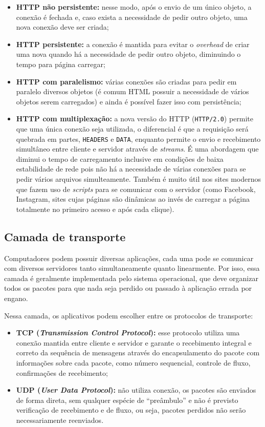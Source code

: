 \documentclass[brazilian,a4paper,twocolumn]{article}
\begin{document}
\begin{itemize}
    \item \textbf{HTTP não persistente:} nesse modo, após o envio de um único objeto, a conexão é fechada e, caso exista a necessidade de pedir outro objeto, uma nova conexão deve ser criada;
    \item \textbf{HTTP persistente:} a conexão é mantida para evitar o \textit{overhead} de criar uma nova quando há a necessidade de pedir outro objeto, diminuindo o tempo para página carregar;
    \item \textbf{HTTP com paralelismo:} várias conexões são criadas para pedir em paralelo diversos objetos (é comum HTML possuir a necessidade de vários objetos serem carregados) e ainda é possível fazer isso com persistência;
    \item \textbf{HTTP com multiplexação:} a nova versão do HTTP (\texttt{HTTP/2.0}) permite que uma única conexão seja utilizada, o diferencial é que a requisição será quebrada em partes, \texttt{HEADERS} e \texttt{DATA}, enquanto permite o envio e recebimento simultâneo entre cliente e servidor através de \textit{streams}. É uma abordagem que diminui o tempo de carregamento inclusive em condições de baixa estabilidade de rede pois não há a necessidade de várias conexões para se pedir vários arquivos simulteamente. Também é muito útil nos sites modernos que fazem uso de \textit{scripts} para se comunicar com o servidor (como Facebook, Instagram, sites cujas páginas são dinâmicas ao invés de carregar a página totalmente no primeiro acesso e após cada clique).
\end{itemize}


\subsection{Camada de transporte}

Computadores podem possuir diversas aplicações, cada uma pode se comunicar com diversos servidores tanto simultaneamente quanto linearmente. Por isso, essa camada é geralmente implementada pelo sistema operacional, que deve organizar todos os pacotes para que nada seja perdido ou passado à aplicação errada por engano.

Nessa camada, os aplicativos podem escolher entre os protocolos de transporte:

\begin{itemize}
    \item \textbf{TCP (\textit{Transmission Control Protocol}):} esse protocolo utiliza uma conexão mantida entre cliente e servidor e garante o recebimento integral e correto da sequência de mensagens através do encapsulamento do pacote com informações sobre cada pacote, como número sequencial, controle de fluxo, confirmações de recebimento;
    \item \textbf{UDP (\textit{User Data Protocol}):} não utiliza conexão, os pacotes são enviados de forma direta, sem qualquer espécie de ``preâmbulo'' e não é previsto verificação de recebimento e de fluxo, ou seja, pacotes perdidos não serão necessariamente reenviados.
\end{itemize}
\end{document}
